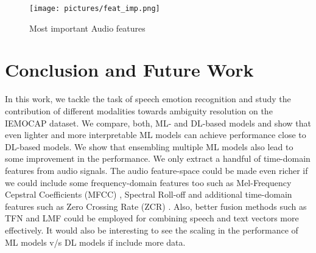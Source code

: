 \documentclass[conference]{IEEEtran}
\begin{document}
\begin{figure}[h]
    \centering
	\texttt{[image: pictures/feat\_imp.png]}
	\caption{Most important Audio features}
	\label{fig:feat_imp}
\end{figure}

\section{Conclusion and Future Work}
In this work, we tackle the task of speech emotion recognition and study the contribution of different modalities towards ambiguity resolution on the IEMOCAP dataset. We compare, both, ML- and DL-based models and show that even lighter and more interpretable ML models can achieve performance close to DL-based models. We show that ensembling multiple ML models also lead to some improvement in the performance. We only extract a handful of time-domain features from audio signals. The audio feature-space could be made even richer if we could include some frequency-domain features too such as Mel-Frequency Cepstral Coefficients (MFCC) \cite{davis1980comparison}, Spectral Roll-off and additional time-domain features such as Zero Crossing Rate (ZCR) \cite{gouyon2000use}. Also, better fusion methods such as TFN \cite{zadeh2017tensor} and LMF \cite{liu2018efficient} could be employed for combining speech and text vectors more effectively. It would also be interesting to see the scaling in the performance of ML models v/s DL models if include more data.

\newpage



\end{document}
